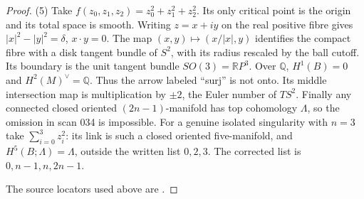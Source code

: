 \begin{proof}
(5) Take $f(z_0,z_1,z_2)=z_0^2+z_1^2+z_2^2$.
Its only critical point is the origin and its total space is smooth.
Writing $z=x+iy$ on the real positive fibre gives
$|x|^2-|y|^2=\delta$, $x\cdot y=0$.
The map $(x,y)\mapsto(x/|x|,y)$ identifies the compact fibre with
a disk tangent bundle of $S^2$, with its radius rescaled by the ball
cutoff. Its boundary is the unit tangent bundle $SO(3)=\mathbb RP^3$.
Over $\mathbb Q$, $H^1(B)=0$ and $H^2(M)^\vee=\mathbb Q$.
Thus the arrow labeled ``surj'' is not onto. Its middle intersection
map is multiplication by $\pm2$, the Euler number of $TS^2$.
Finally any connected closed oriented $(2n-1)$-manifold has top
cohomology $\Lambda$, so the omission in scan 034 is impossible.
For a genuine isolated singularity with $n=3$ take
$\sum_{i=0}^3z_i^2$: its link is such a closed oriented
five-manifold, and $H^5(B;\Lambda)=\Lambda$, outside the written
list $0,2,3$. The corrected list is $0,n-1,n,2n-1$.

The source locators used above are \cite[scans 003, 007, 022, 030, 032, 034]{C-ms122}.
\end{proof}

